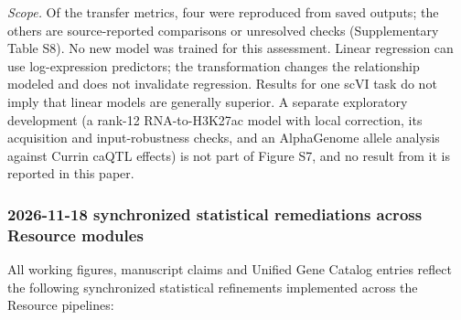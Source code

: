 \emph{Scope.} Of the transfer metrics, four were reproduced from saved outputs; the others are source-reported comparisons or unresolved checks (Supplementary Table S8). No new model was trained for this assessment. Linear regression can use log-expression predictors; the transformation changes the relationship modeled and does not invalidate regression. Results for one scVI task do not imply that linear models are generally superior. A separate exploratory development (a rank-12 RNA-to-H3K27ac model with local correction, its acquisition and input-robustness checks, and an AlphaGenome allele analysis against Currin caQTL effects) is not part of Figure S7, and no result from it is reported in this paper.

\subsubsection{2026-11-18 synchronized statistical remediations across Resource modules}\label{synchronized-remediations-20261118}

All working figures, manuscript claims and Unified Gene Catalog entries reflect the following synchronized statistical refinements implemented across the Resource pipelines:

